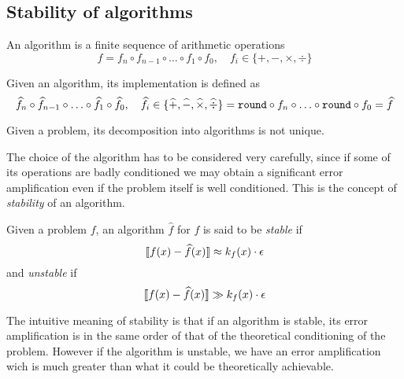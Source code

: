 \subsection{Stability of algorithms}
\begin{Def}[Algorithm]
	An algorithm is a finite sequence of arithmetic operations
	\begin{dmath*}
		f = f_n \circ f_{n-1} \circ \ldots \circ f_1 \circ f_0, \quad { f_i \in \{+,-,\times,\div\} }
	\end{dmath*}
\end{Def}
\begin{Def}[Implementation]
	Given an algorithm, its implementation is defined as
	\begin{dmath*}
		{ \hat{f}_n \circ \hat{f}_{n-1} \circ \ldots \circ \hat{f}_1 \circ \hat{f}_0, \quad \hat{f}_i \in \{\hat{+},\hat{-},\hat{\times},\hat{\div}\} }\\
		= \texttt{round} \circ f_n \circ \ldots \circ \texttt{round} \circ f_0
		= \hat{f}
	\end{dmath*}
\end{Def}
\begin{Rem}
	Given a problem, its decomposition into algorithms is not unique.
\end{Rem}
\begin{Rem}
	The choice of the algorithm has to be considered very carefully, since if some of its operations are badly conditioned we may obtain a significant error amplification even if the problem itself is well conditioned. This is the concept of \emph{stability} of an algorithm.
\end{Rem}
\begin{Def}[Stability]
	Given a problem $f$, an algorithm $\hat{f}$ for $f$ is said to be \emph{stable} if
	\begin{equation*}
		\llbracket f(x) - \widehat{f}(x) \rrbracket \approx k_f(x) \cdot \epsilon
	\end{equation*}
	and \emph{unstable} if
	\begin{equation*}
		\llbracket f(x) - \widehat{f}(x) \rrbracket \gg k_f(x) \cdot \epsilon
	\end{equation*}
\end{Def}
\begin{Rem}
	The intuitive meaning of stability is that if an algorithm is stable, its error amplification is in the same order of that of the theoretical conditioning of the problem. However if the algorithm is unstable, we have an error amplification wich is much greater than what it could be theoretically achievable.
\end{Rem}
